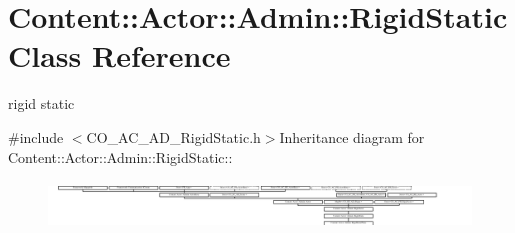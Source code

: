 \hypertarget{classContent_1_1Actor_1_1Admin_1_1RigidStatic}{
\section{Content::Actor::Admin::RigidStatic Class Reference}
\label{classContent_1_1Actor_1_1Admin_1_1RigidStatic}
}


rigid static  


{\ttfamily \#include $<$CO\_\-AC\_\-AD\_\-RigidStatic.h$>$}Inheritance diagram for Content::Actor::Admin::RigidStatic::\begin{figure}[H]
\begin{center}
\leavevmode
\includegraphics[height=1.28834cm]{classContent_1_1Actor_1_1Admin_1_1RigidStatic}
\end{center}
\end{figure}
